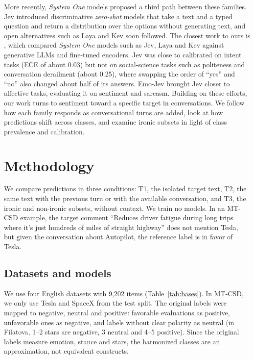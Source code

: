 \documentclass[12pt]{article}
\begin{document}
More recently, \emph{System One} models proposed a third path between these families. Jev \cite{typesafe2026jev} introduced discriminative \emph{zero-shot} models that take a text and a typed question and return a distribution over the options without generating text, and open alternatives such as Laya \cite{convai2026laya} and Kev \cite{palmer2026kev} soon followed. The closest work to ours is \cite{rafe2026benchmarking}, which compared \emph{System One} models such as Jev, Laya and Kev against generative LLMs and fine-tuned encoders. Jev was close to calibrated on intent tasks (ECE of about 0.03) but not on social-science tasks such as politeness and conversation derailment (about 0.25), where swapping the order of ``yes'' and ``no'' also changed about half of its answers. Emo-Jev \cite{zhang2026emojev} brought Jev closer to affective tasks, evaluating it on sentiment and sarcasm. Building on these efforts, our work turns to sentiment toward a specific target in conversations. We follow how each family responds as conversational turns are added, look at how predictions shift across classes, and examine ironic subsets in light of class prevalence and calibration.

\section{Methodology}
\label{sec:org46ba3a7}
We compare predictions in three conditions: T1, the isolated target text, T2, the same text with the previous turn or with the available conversation, and T3, the ironic and non-ironic subsets, without context. We train no models. In an MT-CSD example, the target comment ``Reduces driver fatigue during long trips where it's just hundreds of miles of straight highway'' does not mention Tesla, but given the conversation about Autopilot, the reference label is in favor of Tesla.

\subsection{Datasets and models}
We use four English datasets with 9,202 items (Table~\ref{tab:bases}). In MT-CSD, we only use Tesla and SpaceX from the test split. The original labels were mapped to negative, neutral and positive: favorable evaluations as positive, unfavorable ones as negative, and labels without clear polarity as neutral (in Filatova, 1--2 stars are negative, 3 neutral and 4--5 positive). Since the original labels measure emotion, stance and stars, the harmonized classes are an approximation, not equivalent constructs.
\end{document}
